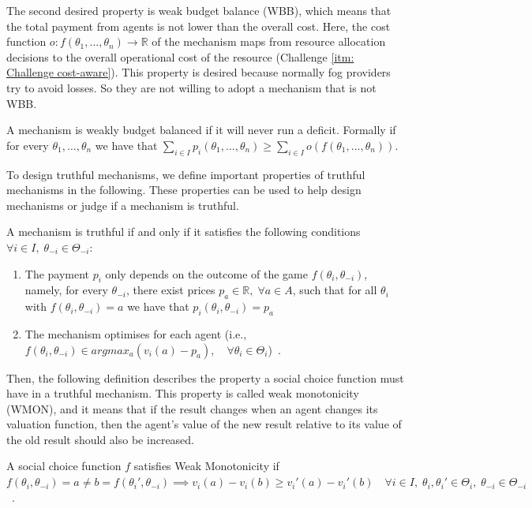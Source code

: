 \documentclass[11pt]{phdthesis}
\begin{document}
The second desired property is weak budget balance (WBB), which means that the total payment from agents is not lower than the overall cost. Here, the cost function $ o: f(\theta_1,...,\theta_n) \rightarrow \mathbb{R} $ of the mechanism maps from resource allocation decisions to the overall operational cost of the resource (Challenge \ref{itm: Challenge cost-aware}). This property is desired because normally fog providers try to avoid losses. So they are not willing to adopt a mechanism that is not WBB. 

\begin{definition}
	A mechanism is weakly budget balanced if it will never run a deficit. Formally if for every $ \theta_1,\ldots, \theta_n $ we have that $ \sum_{i \in I} p_i(\theta_1,...,\theta_n) \geq \sum_{i \in I} o(f(\theta_1,...,\theta_n)) $. 
\end{definition}


To design truthful mechanisms, we define important properties of truthful mechanisms in the following. These properties can be used to help design mechanisms or judge if a mechanism is truthful. 
\begin{proposition}
	A mechanism is truthful if and only if it satisfies the following conditions $\forall i \in I,\; \theta_{-i} \in \Theta_{-i}$:
	\begin{enumerate}
		\item The payment $p_i$ only depends on the outcome of the game $f(\theta_i, \theta_{-i})$, namely, for every $\theta_{-i}$, there exist prices $p_a \in \mathbb{R}, \; \forall a \in A$, such that for all $\theta_i$ with $f(\theta_i, \theta_{-i})=a$ we have that $p_i(\theta_i,\theta_{-i}) = p_a$
		\item The mechanism optimises for each agent (i.e., $f(\theta_i, \theta_{-i}) \in argmax_a(v_i(a) - p_a), \quad \forall \theta_i \in \Theta_{i}$)~\citep[Proposition 9.27]{nisan2007algorithmic}. 
	\end{enumerate}
\end{proposition}

Then, the following definition describes the property a social choice function must have in a truthful mechanism. This property is called weak monotonicity (WMON), and it means that if the result changes when an agent changes its valuation function, then the agent's value of the new result relative to its value of the old result should also be increased.
\begin{definition}
	A social choice function $f$ satisfies Weak Monotonicity if $ f(\theta_i, \theta_{-i}) = a \neq b = f(\theta_i', \theta_{-i}) \implies v_i(a) - v_i(b) \geq v_i'(a) - v_i'(b) \quad \forall i \in I, \;  \theta_i,\theta_{i}' \in \Theta_i, \; \theta_{-i} \in \Theta_{-i} $~\citep[Definition 9.28]{nisan2007algorithmic}.
\end{definition}
\end{document}
